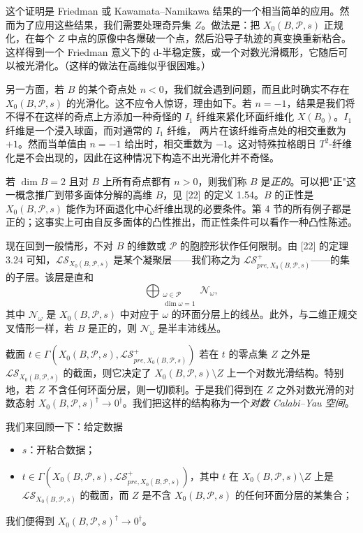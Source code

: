 这个证明是 Friedman 或 Kawamata--Namikawa 结果的一个相当简单的应用。然而为了应用这些结果，我们需要处理奇异集 $Z$。做法是：把 $X_0(B,\mathcal P,s)$ 正规化，在每个 $Z$ 中点的原像中各爆破一个点，然后沿导子轨迹的真变换重新粘合。这样得到一个 Friedman 意义下的 d-半稳定簇，或一个对数光滑概形，它随后可以被光滑化。（这样的做法在高维似乎很困难。）

另一方面，若 $B$ 的某个奇点处 $n<0$，我们就会遇到问题，而且此时确实不存在 $X_0(B,\mathcal P,s)$ 的光滑化。这不应令人惊讶，理由如下。若 $n=-1$，结果是我们将不得不在这样的奇点上方添加一种奇怪的 $I_1$ 纤维来紧化环面纤维化 $X(B_0)$。$I_1$ 纤维是一个浸入球面，而对通常的 $I_1$ 纤维，
两片在该纤维奇点处的相交重数为 $+1$。然而当单值由 $n=-1$ 给出时，相交重数为 $-1$。这对特殊拉格朗日 $T^2$-纤维化是不会出现的，因此在这种情况下构造不出光滑化并不奇怪。\proofend

若 $\dim B=2$ 且对 $B$ 上所有奇点都有 $n>0$，则我们称 $B$ 是\emph{正的}。可以把"正"这一概念推广到带多面体分解的高维 $B$，见 [22] 的定义 1.54。$B$ 的正性是 $X_0(B,\mathcal P,s)$ 能作为环面退化中心纤维出现的必要条件。第 4 节的所有例子都是正的；这事实上可由自反多面体的凸性推出，而正性条件可以看作一种凸性陈述。

现在回到一般情形，不对 $B$ 的维数或 $\mathcal P$ 的胞腔形状作任何限制。由 [22] 的定理 3.24 可知，$\mathcal{LS}_{X_0(B,\mathcal P,s)}$ 是某个凝聚层------我们称之为 $\mathcal{LS}^+_{pre,X_0(B,\mathcal P,s)}$------的集的子层。该层是直和
\[
\bigoplus_{\substack{\omega\in\mathcal P\\ \dim\omega=1}}\mathcal N_\omega,
\]
其中 $\mathcal N_\omega$ 是 $X_0(B,\mathcal P,s)$ 中对应于 $\omega$ 的环面分层上的线丛。此外，与二维正规交叉情形一样，若 $B$ 是正的，则 $\mathcal N_\omega$ 是半丰沛线丛。

截面 $t\in\Gamma(X_0(B,\mathcal P,s),\mathcal{LS}^+_{pre,X_0(B,\mathcal P,s)})$ 若在 $t$ 的零点集 $Z$ 之外是 $\mathcal{LS}_{X_0(B,\mathcal P,s)}$ 的截面，则它决定了 $X_0(B,\mathcal P,s)\setminus Z$ 上一个对数光滑结构。特别地，若 $Z$ 不含任何环面分层，则一切顺利。于是我们得到在 $Z$ 之外对数光滑的对数态射 $X_0(B,\mathcal P,s)^\dagger\to0^\dagger$。我们把这样的结构称为一个\emph{对数 Calabi--Yau 空间}。

我们来回顾一下：给定数据
\begin{itemize}
\item $s$：开粘合数据；
\item $t\in\Gamma(X_0(B,\mathcal P,s),\mathcal{LS}^+_{pre,X_0(B,\mathcal P,s)})$，其中 $t$ 在 $X_0(B,\mathcal P,s)\setminus Z$ 上是 $\mathcal{LS}_{X_0(B,\mathcal P,s)}$ 的截面，而 $Z$ 是不含 $X_0(B,\mathcal P,s)$ 的任何环面分层的某集合；
\end{itemize}
我们便得到 $X_0(B,\mathcal P,s)^\dagger\to0^\dagger$。

